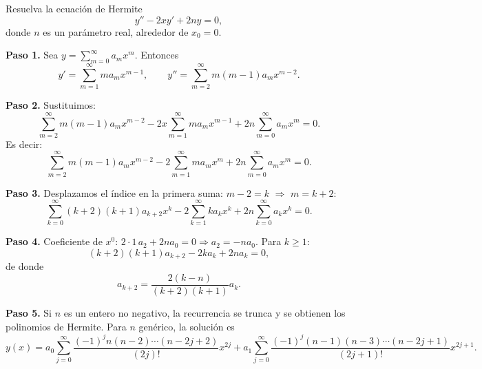 \begin{example}
  Resuelva la ecuación de Hermite
  \[
    y'' - 2x y' + 2n y = 0,
  \]
  donde $n$ es un parámetro real, alrededor de $x_0=0$.
  \begin{myproof}
    \textbf{Paso 1.} Sea $y=\sum_{m=0}^{\infty} a_m x^m$. Entonces
    \[
      y'=\sum_{m=1}^{\infty} m a_m x^{m-1},\qquad
      y''=\sum_{m=2}^{\infty} m(m-1) a_m x^{m-2}.
    \]
    
    \textbf{Paso 2.} Sustituimos:
    \[
      \sum_{m=2}^{\infty} m(m-1) a_m x^{m-2}
      - 2x\sum_{m=1}^{\infty} m a_m x^{m-1}
      + 2n\sum_{m=0}^{\infty} a_m x^m = 0.
    \]
    Es decir:
    \[
      \sum_{m=2}^{\infty} m(m-1) a_m x^{m-2}
      - 2\sum_{m=1}^{\infty} m a_m x^m
      + 2n\sum_{m=0}^{\infty} a_m x^m = 0.
    \]
    
    \textbf{Paso 3.} Desplazamos el índice en la primera suma: $m-2=k$ $\Rightarrow$ $m=k+2$:
    \[
      \sum_{k=0}^{\infty} (k+2)(k+1) a_{k+2} x^k
      - 2\sum_{k=1}^{\infty} k a_k x^k
      + 2n\sum_{k=0}^{\infty} a_k x^k = 0.
    \]
    
    \textbf{Paso 4.} Coeficiente de $x^0$: $2\cdot 1\, a_2 + 2n a_0 = 0 \Rightarrow a_2 = -n a_0$.
    Para $k\ge 1$:
    \[
      (k+2)(k+1) a_{k+2} - 2k a_k + 2n a_k = 0,
    \]
    de donde
    \[
      a_{k+2} = \frac{2(k-n)}{(k+2)(k+1)} a_k.
    \]
    
    \textbf{Paso 5.} Si $n$ es un entero no negativo, la recurrencia se trunca y se obtienen los polinomios de Hermite. Para $n$ genérico, la solución es
    \[
      \boxed{
        y(x)=a_0\sum_{j=0}^{\infty} \frac{(-1)^j n(n-2)\cdots(n-2j+2)}{(2j)!} x^{2j}
        + a_1\sum_{j=0}^{\infty} \frac{(-1)^j (n-1)(n-3)\cdots(n-2j+1)}{(2j+1)!} x^{2j+1}
      }.
    \]
  \end{myproof}
\end{example}

